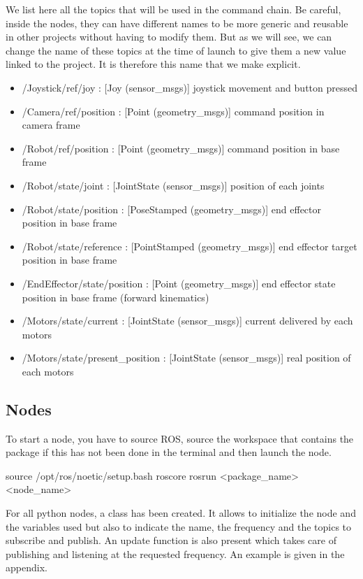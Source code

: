 We list here all the topics that will be used in the command chain. Be careful, inside the nodes, they can have different names to be more generic and reusable in other projects without having to modify them. But as we will see, we can change the name of these topics at the time of launch to give them a new value linked to the project. It is therefore this name that we make explicit. 
\begin{itemize}
    \item /Joystick/ref/joy : [Joy (sensor\_msgs)] joystick movement and button pressed
    \item /Camera/ref/position : [Point (geometry\_msgs)] command position in camera frame
    \item /Robot/ref/position : [Point (geometry\_msgs)] command position in base frame
    \item /Robot/state/joint : [JointState (sensor\_msgs)] position of each joints
    \item /Robot/state/position : [PoseStamped (geometry\_msgs)] end effector position in base frame
    \item /Robot/state/reference : [PointStamped (geometry\_msgs)] end effector target position in base frame
    \item /EndEffector/state/position : [Point (geometry\_msgs)] end effector state position in base frame (forward kinematics)
    \item /Motors/state/current : [JointState (sensor\_msgs)] current delivered by each motors
    \item /Motors/state/present\_position : [JointState (sensor\_msgs)] real position of each motors
\end{itemize}

\subsection{Nodes}
To start a node, you have to source ROS, source the workspace that contains the package if this has not been done in the terminal and then launch the node.
\begin{commandshell}
    source /opt/ros/noetic/setup.bash
    roscore
    rosrun <package_name> <node_name>
\end{commandshell}

\bigbreak
For all python nodes, a class has been created. It allows to initialize the node and the variables used but also to indicate the name, the frequency and the topics to subscribe and publish. An update function is also present which takes care of publishing and listening at the requested frequency. An example is given in the appendix.

